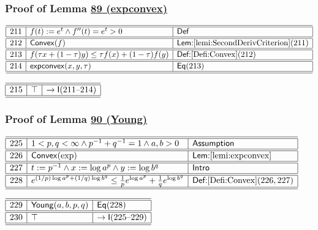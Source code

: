 \documentclass[11pt,reqno]{amsart}
\begin{document}
\medskip

\subsubsection*{Proof of Lemma \hyperlink{lem:expconvex}{89 (\textsf{expconvex})}}

\noindent$%
\begin{array}{|r|l|l|}
\hline\hline
211 & f(t):=e^{t}\wedge f^{\prime \prime }(t)=e^{t}>0 & \mathsf{Def} \\ \hline\hline
212 & \mathsf{Convex}(f) & \textsf{Lem:}\ref{lemi:SecondDerivCriterion}(211) \\ \hline\hline
213 & f(\tau x+(1-\tau)y)\le\tau f(x)+(1-\tau)f(y) & \textsf{Def:}\ref{Defi:Convex}(212) \\ \hline\hline
214 & \mathsf{expconvex}(x,y,\tau) & \mathsf{Eq}(213) \\ \hline\hline
\end{array}%
$

\medskip

\noindent$%
\begin{array}{|r|l|l|}
\hline\hline
215 & \top & \to\mathsf{I}(211\text{--}214) \\ \hline\hline
\end{array}%
$

\medskip

\subsubsection*{Proof of Lemma \hyperlink{lem:Young}{90 (\textsf{Young})}}

\noindent$%
\begin{array}{|r|l|l|}
\hline\hline
225 & 1<p,q<\infty\wedge p^{-1}+q^{-1}=1\wedge a,b>0 & \textsf{Assumption} \\ \hline\hline
226 & \mathsf{Convex}(\exp) & \textsf{Lem:}\ref{lemi:expconvex} \\ \hline\hline
227 & t:=p^{-1}\wedge x:=\log a^{p}\wedge y:=\log b^{q} & \textsf{Intro} \\ \hline\hline
228 & e^{(1/p)\log a^{p}+(1/q)\log b^{q}}\le\tfrac{1}{p}e^{\log a^{p}}+\tfrac{1}{q}e^{\log b^{q}} & \textsf{Def:}\ref{Defi:Convex}(226,227) \\ \hline\hline
\end{array}%
$

\medskip

\noindent$%
\begin{array}{|r|l|l|}
\hline\hline
229 & \mathsf{Young}(a,b,p,q) & \mathsf{Eq}(228) \\ \hline\hline
230 & \top & \to\mathsf{I}(225\text{--}229) \\ \hline\hline
\end{array}%
$
\end{document}
